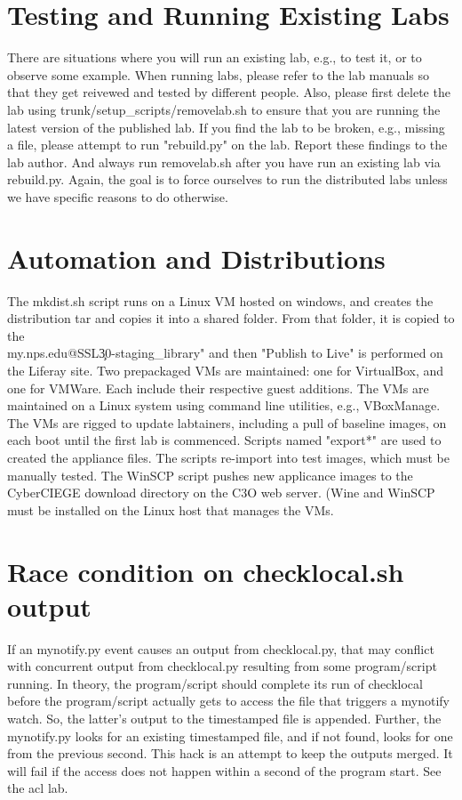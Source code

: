 \section{Testing and Running Existing Labs}
There are situations where you will run an existing lab, e.g., to test it, or to 
observe some example.  When running labs, please refer to the lab manuals
so that they get reivewed and tested by different people.  Also, please first delete
the lab using trunk/setup\_scripts/removelab.sh to ensure that you are running the latest
version of the published lab.  If you find the lab to be broken, e.g., missing a file, please
attempt to run "rebuild.py" on the lab.  Report these findings to the lab author.  And always
run removelab.sh after you have run an existing lab via rebuild.py.  Again, the goal is to
force ourselves to run the distributed labs unless we have specific reasons to do otherwise.


\section{Automation and Distributions}
The mkdist.sh script runs on a Linux VM hosted on windows, and creates the distribution tar 
and copies it into a shared folder.  From that folder, it is copied to the 
\\my.nps.edu@SSL\DavWWWRoot\webdav\c30-staging\document\_library" and then "Publish to Live" is 
performed on the Liferay site.
Two prepackaged VMs are maintained: one for VirtualBox, and one for VMWare.  Each include
their respective guest additions.  The VMs are maintained on a Linux system using command line
utilities, e.g., VBoxManage.  The VMs are rigged to update labtainers, including a pull of
baseline images, on each boot until the first lab is commenced.  Scripts named "export*" are
used to created the appliance files.  The scripts re-import into test images, which must be
manually tested.  The WinSCP script pushes new applicance images to the CyberCIEGE download
directory on the C3O web server.  (Wine and WinSCP must be installed on the Linux host that
manages the VMs.

\section {Race condition on checklocal.sh output}
If an mynotify.py event causes an output from checklocal.py, that may conflict with
concurrent output from checklocal.py resulting from some program/script running.  In 
theory, the program/script should complete its run of checklocal before the program/script
actually gets to access the file that triggers a mynotify watch.  So, the latter's output
to the timestamped file is appended.  Further, the mynotify.py looks for an existing timestamped
file, and if not found, looks for one from the previous second.  This hack is an attempt to
keep the outputs merged.  It will fail if the access does not happen within a second of the
program start.  See the acl lab.

